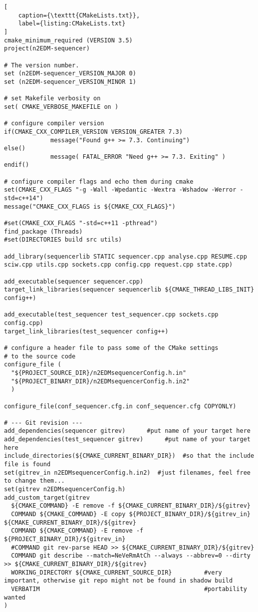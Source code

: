 \begin{lstlisting}[
	caption={\texttt{CMakeLists.txt}},
	label={listing:CMakeLists.txt}
]
cmake_minimum_required (VERSION 3.5)
project(n2EDM-sequencer)

# The version number.
set (n2EDM-sequencer_VERSION_MAJOR 0)
set (n2EDM-sequencer_VERSION_MINOR 1)

# set Makefile verbosity on
set( CMAKE_VERBOSE_MAKEFILE on )

# configure compiler version
if(CMAKE_CXX_COMPILER_VERSION VERSION_GREATER 7.3)
             message("Found g++ >= 7.3. Continuing")
else()
             message( FATAL_ERROR "Need g++ >= 7.3. Exiting" )
endif()

# configure compiler flags and echo them during cmake
set(CMAKE_CXX_FLAGS "-g -Wall -Wpedantic -Wextra -Wshadow -Werror -std=c++14")
message("CMAKE_CXX_FLAGS is ${CMAKE_CXX_FLAGS}")

#set(CMAKE_CXX_FLAGS "-std=c++11 -pthread")
find_package (Threads)
#set(DIRECTORIES build src utils)

add_library(sequencerlib STATIC sequencer.cpp analyse.cpp RESUME.cpp sciw.cpp utils.cpp sockets.cpp config.cpp request.cpp state.cpp)

add_executable(sequencer sequencer.cpp)
target_link_libraries(sequencer sequencerlib ${CMAKE_THREAD_LIBS_INIT} config++)

add_executable(test_sequencer test_sequencer.cpp sockets.cpp config.cpp)
target_link_libraries(test_sequencer config++)

# configure a header file to pass some of the CMake settings
# to the source code
configure_file (
  "${PROJECT_SOURCE_DIR}/n2EDMsequencerConfig.h.in"
  "${PROJECT_BINARY_DIR}/n2EDMsequencerConfig.h.in2"
  )

configure_file(conf_sequencer.cfg.in conf_sequencer.cfg COPYONLY)

# --- Git revision ---
add_dependencies(sequencer gitrev)      #put name of your target here
add_dependencies(test_sequencer gitrev)      #put name of your target here
include_directories(${CMAKE_CURRENT_BINARY_DIR})  #so that the include file is found
set(gitrev_in n2EDMsequencerConfig.h.in2)  #just filenames, feel free to change them...
set(gitrev n2EDMsequencerConfig.h)
add_custom_target(gitrev
  ${CMAKE_COMMAND} -E remove -f ${CMAKE_CURRENT_BINARY_DIR}/${gitrev}
  COMMAND ${CMAKE_COMMAND} -E copy ${PROJECT_BINARY_DIR}/${gitrev_in} ${CMAKE_CURRENT_BINARY_DIR}/${gitrev}
  COMMAND ${CMAKE_COMMAND} -E remove -f ${PROJECT_BINARY_DIR}/${gitrev_in}
  #COMMAND git rev-parse HEAD >> ${CMAKE_CURRENT_BINARY_DIR}/${gitrev}
  COMMAND git describe --match=NeVeRmAtCh --always --abbrev=0 --dirty >> ${CMAKE_CURRENT_BINARY_DIR}/${gitrev}
  WORKING_DIRECTORY ${CMAKE_CURRENT_SOURCE_DIR}         #very important, otherwise git repo might not be found in shadow build
  VERBATIM                                              #portability wanted
)





\end{lstlisting}
